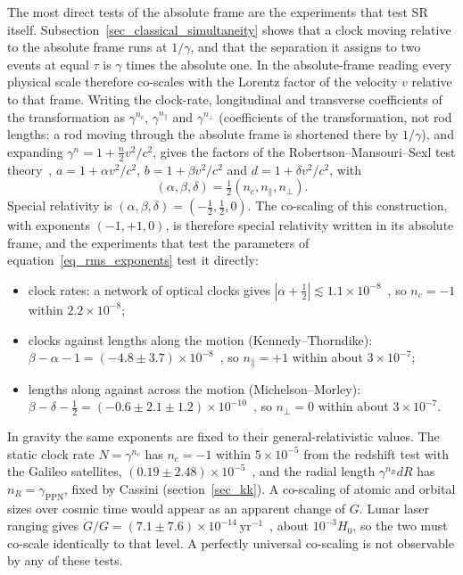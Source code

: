 \documentclass[anonymous]{iopjournal}
\begin{document}
The most direct tests of the absolute frame are the experiments that test SR itself. 
Subsection~\ref{sec_classical_simultaneity} shows that a clock moving relative to the absolute frame runs at $1/\gamma$, and that the separation it assigns to two events at equal $\tau$ is $\gamma$ times the absolute one. In the absolute-frame reading every physical scale therefore co-scales with the Lorentz factor of the velocity $v$ relative to that frame. Writing the clock-rate, longitudinal and transverse coefficients of the transformation as $\gamma^{n_c}$, $\gamma^{n_\parallel}$ and $\gamma^{n_\perp}$ (coefficients of the transformation, not rod lengths: a rod moving through the absolute frame is shortened there by $1/\gamma$), and expanding $\gamma^n=1+\tfrac{n}{2}v^2/c^2$, gives the factors of the Robertson--Mansouri--Sexl test theory~\cite{MansouriSexl1977}, $a=1+\alpha v^2/c^2$, $b=1+\beta v^2/c^2$ and $d=1+\delta v^2/c^2$, with
\begin{equation}\label{eq_rms_exponents}
    \left(\alpha,\beta,\delta\right)=\tfrac12\left(n_c,n_\parallel,n_\perp\right).
\end{equation}
Special relativity is $(\alpha,\beta,\delta)=(-\tfrac12,\tfrac12,0)$. The co-scaling of this construction, with exponents $(-1,+1,0)$, is therefore special relativity written in its absolute frame, and the experiments that test the parameters of equation~\eqref{eq_rms_exponents} test it directly:
\begin{itemize}
\item clock rates: a network of optical clocks gives $|\alpha+\tfrac12|\lesssim1.1\times10^{-8}$~\cite{Delva2017}, so $n_c=-1$ within $2.2\times10^{-8}$;
\item clocks against lengths along the motion (Kennedy--Thorndike): $\beta-\alpha-1=(-4.8\pm3.7)\times10^{-8}$~\cite{Tobar2010}, so $n_\parallel=+1$ within about $3\times10^{-7}$;
\item lengths along against across the motion (Michelson--Morley): $\beta-\delta-\tfrac12=(-0.6\pm2.1\pm1.2)\times10^{-10}$~\cite{Antonini2005,Schiller2006}, so $n_\perp=0$ within about $3\times10^{-7}$.
\end{itemize}
In gravity the same exponents are fixed to their general-relativistic values. The static clock rate $N=\gamma^{n_c}$ has $n_c=-1$ within $5\times10^{-5}$ from the redshift test with the Galileo satellites, $(0.19\pm2.48)\times10^{-5}$~\cite{Delva2018}, and the radial length $\gamma^{n_R}dR$ has $n_R=\gamma_{\mathrm{PPN}}$, fixed by Cassini (section~\ref{sec_kk}). A co-scaling of atomic and orbital sizes over cosmic time would appear as an apparent change of $G$. Lunar laser ranging gives $\dot G/G=(7.1\pm7.6)\times10^{-14}~\mathrm{yr^{-1}}$~\cite{HofmannMuller2018}, about $10^{-3}H_0$, so the two must co-scale identically to that level. A perfectly universal co-scaling is not observable by any of these tests.
\end{document}
